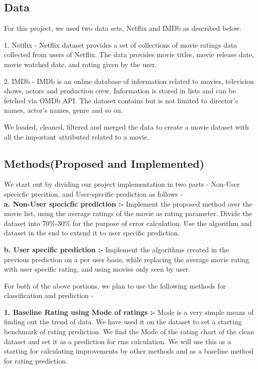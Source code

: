 \documentclass[11pt]{article}
\begin{document}
\subsection{Data}
For this project, we used two data sets, Netflix and IMDb as described below.


	1. Netflix - Netflix dataset provides a set of collections of movie ratings data collected from users of Netflix. The data provides movie titles, movie release date, movie watched date, and rating given by the user.
	
	
	2. IMDb - IMDb is an online database of information related to movies, television shows, actors and production crew. Information is stored in lists and can be fetched via OMDb API. The dataset contains but is not limited to director's names, actor's names, genre and so on.

	We loaded, cleaned, filtered and merged the data to create a movie dataset with all the important attributed related to a movie.
	
\subsection{Methods(Proposed and Implemented)}
	We start out by dividing our project implementation in two parts - Non-User specicfic precition, and User-specific prediction as follows - \\
	
	{\bfseries a. Non-User specicfic prediction :-} 
		Implement the proposed method over the movie list, using the average ratings of the movie as rating parameter. Divide the dataset into 70\%-30\% for the purpose of error calculation. Use the algorithm and dataset in the end to extend it to user specific prediction.
		
	{\bfseries b. User specific prediction :-} 
		Implement the algorithms created in the previous prediction on a per user basis, while replacing the average movie rating with  user specific rating, and using movies only seen by user.
		
For both of the above portions, we plan to use the following methods for classification and prediction - 	

	{\bfseries 1. Baseline Rating using Mode of ratings :-} 
		Mode is a very simple means of finding out the trend of data. 
		We have used it on the dataset to set a starting benchmark of rating prediction. We find the Mode of the rating chart of the clean dataset and set it as a prediction for rms calculation. We will use this as a starting for calculating improvements by other methods and as a baseline method for rating prediction.
	
\end{document}
